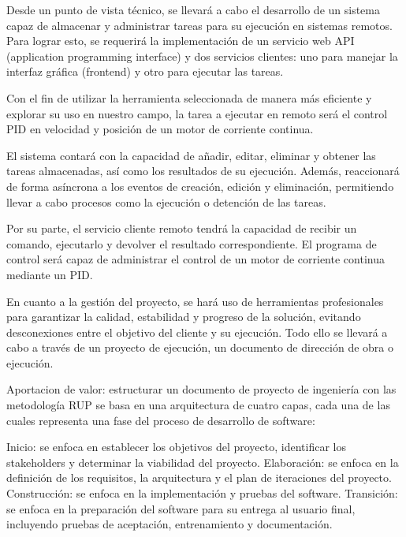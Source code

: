 Desde un punto de vista técnico, se llevará a cabo el desarrollo de un sistema capaz de almacenar y administrar tareas para su ejecución en sistemas remotos. Para lograr esto, se requerirá la implementación de un servicio web API (application programming interface) y dos servicios clientes: uno para manejar la interfaz gráfica (frontend) y otro para ejecutar las tareas.

Con el fin de utilizar la herramienta seleccionada de manera más eficiente y explorar su uso en nuestro campo, la tarea a ejecutar en remoto será el control PID en velocidad y posición de un motor de corriente continua.

El sistema contará con la capacidad de añadir, editar, eliminar y obtener las tareas almacenadas, así como los resultados de su ejecución. Además, reaccionará de forma asíncrona a los eventos de creación, edición y eliminación, permitiendo llevar a cabo procesos como la ejecución o detención de las tareas.

Por su parte, el servicio cliente remoto tendrá la capacidad de recibir un comando, ejecutarlo y devolver el resultado correspondiente. El programa de control será capaz de administrar el control de un motor de corriente continua mediante un PID.

En cuanto a la gestión del proyecto, se hará uso de herramientas profesionales para garantizar la calidad, estabilidad y progreso de la solución, evitando desconexiones entre el objetivo del cliente y su ejecución. Todo ello se llevará a cabo a través de un proyecto de ejecución, un documento de dirección de obra o ejecución.


Aportacion de valor: estructurar un documento de proyecto de ingeniería con las metodología RUP se basa en una arquitectura de cuatro capas, cada una de las cuales representa una fase del proceso de desarrollo de software:

Inicio: se enfoca en establecer los objetivos del proyecto, identificar los stakeholders y determinar la viabilidad del proyecto.
Elaboración: se enfoca en la definición de los requisitos, la arquitectura y el plan de iteraciones del proyecto.
Construcción: se enfoca en la implementación y pruebas del software.
Transición: se enfoca en la preparación del software para su entrega al usuario final, incluyendo pruebas de aceptación, entrenamiento y documentación.
